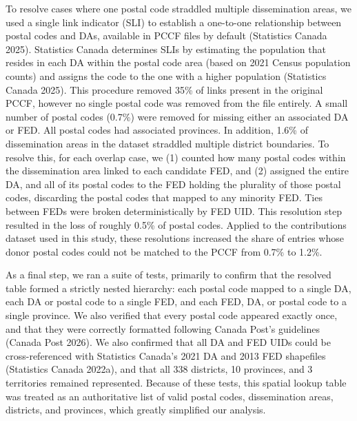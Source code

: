 \documentclass[
  letterpaper,
  DIV=11,
  numbers=noendperiod]{scrartcl}
\begin{document}
To resolve cases where one postal code straddled multiple dissemination
areas, we used a single link indicator (SLI) to establish a one-to-one
relationship between postal codes and DAs, available in PCCF files by
default (Statistics Canada 2025). Statistics Canada determines SLIs by
estimating the population that resides in each DA within the postal code
area (based on 2021 Census population counts) and assigns the code to
the one with a higher population (Statistics Canada 2025). This
procedure removed 35\% of links present in the original PCCF, however no
single postal code was removed from the file entirely. A small number of
postal codes (0.7\%) were removed for missing either an associated DA or
FED. All postal codes had associated provinces. In addition, 1.6\% of
dissemination areas in the dataset straddled multiple district
boundaries. To resolve this, for each overlap case, we (1) counted how
many postal codes within the dissemination area linked to each candidate
FED, and (2) assigned the entire DA, and all of its postal codes to the
FED holding the plurality of those postal codes, discarding the postal
codes that mapped to any minority FED. Ties between FEDs were broken
deterministically by FED UID. This resolution step resulted in the loss
of roughly 0.5\% of postal codes. Applied to the contributions dataset
used in this study, these resolutions increased the share of entries
whose donor postal codes could not be matched to the PCCF from 0.7\% to
1.2\%.

As a final step, we ran a suite of tests, primarily to confirm that the
resolved table formed a strictly nested hierarchy: each postal code
mapped to a single DA, each DA or postal code to a single FED, and each
FED, DA, or postal code to a single province. We also verified that
every postal code appeared exactly once, and that they were correctly
formatted following Canada Post's guidelines (Canada Post 2026). We also
confirmed that all DA and FED UIDs could be cross-referenced with
Statistics Canada's 2021 DA and 2013 FED shapefiles (Statistics Canada
2022a), and that all 338 districts, 10 provinces, and 3 territories
remained represented. Because of these tests, this spatial lookup table
was treated as an authoritative list of valid postal codes,
dissemination areas, districts, and provinces, which greatly simplified
our analysis.
\end{document}
